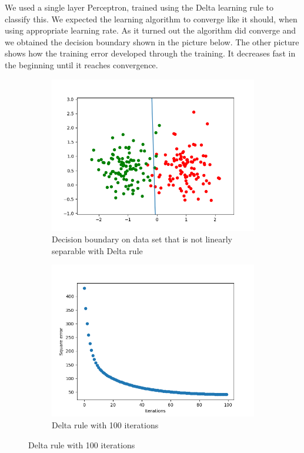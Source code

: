 \documentclass[a4paper]{article}
\begin{document}
We used a single layer Perceptron, trained using the Delta learning rule to classify this. We expected the learning algorithm to converge like it should, when using appropriate learning rate. As it turned out the algorithm did converge and we obtained the decision boundary shown in the picture below. The other picture shows how the training error developed through the training. It decreases fast in the beginning until it reaches convergence.

 
\begin{figure}[htb]
    \centering
    \begin{subfigure}{0.4\textwidth}
        \includegraphics[width=\textwidth]{Labs/Lab 1/Lab 1a/Results/decicion-boundary-not-separable.png}
        \caption{Decision boundary on data set that is not linearly separable with Delta rule}
        \label{fig:Decision-boundary-not-linearly-separable}
    \end{subfigure}
    \hfill
    \begin{subfigure}{0.4\textwidth}
        \includegraphics[width=\textwidth]{Labs/Lab 1/Lab 1a/Results/error-convergance.png}
        \caption{Delta rule with 100 iterations}
        \label{fig:Error-convergance}
    \end{subfigure}
\end{figure}
\end{document}
